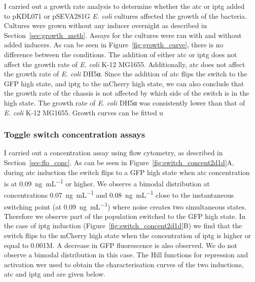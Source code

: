 I carried out a growth rate analysis to determine whether the \acrshort{atc} or \acrshort{iptg} added to pKDL071 or pSEVA281G \textit{E. coli} cultures affected the growth of the bacteria. Cultures were grown without any inducer overnight as described in Section~\ref{sec:growth_meth}. Assays for the cultures were ran with and without added inducers. As can be seen in Figure~\ref{fig:growth_curve}, there is no difference between the conditions. The addition of either \acrshort{atc} or \acrshort{iptg} does not affect the growth rate of \textit{E. coli} K-12 MG1655. Additionally, \acrshort{atc} does not affect the growth rate of \textit{E. coli} DH5α. Since the addition of \acrshort{atc} flips the switch to the GFP high state, and \acrshort{iptg} to the mCherry high state, we can also conclude that the growth rate of the chassis is not affected by which side of the switch is in the high state. The growth rate of \textit{E. coli} DH5α was consistently lower than that of \textit{E. coli} K-12 MG1655. Growth curves can be fitted u




\subsubsection{Toggle switch concentration assays}

I carried out a concentration assay using flow cytometry, as described in Section~\ref{sec:flo_conc}. As can be seen in Figure~\ref{fig:switch_concent2d1d}A, during \acrshort{atc} induction the switch flips to a GFP high state when \acrshort{atc} concentration is at \SI{0.09}{\nano\gram\per\milli\liter} or higher. We observe a bimodal distribution at concentrations \SI{0.07}{\nano\gram\per\milli\liter} and \SI{0.08}{\nano\gram\per\milli\liter} close to the instantaneous switching point (at \SI{0.09}{\nano\gram\per\milli\liter}) where noise creates two simultaneous states. Therefore we observe part of the population switched to the GFP high state. In the case of \acrshort{iptg} induction (Figure~\ref{fig:switch_concent2d1d}B) we find that the switch flips to the mCherry high state when the concentration of \acrshort{iptg} is higher or equal to 0.001M. A decrease in GFP fluorescence is also observed. We do not observe a bimodal distribution in this case. The Hill functions for repression and activation wer used to obtain the characterisation curves of the two inductions, \acrshort{atc} and \acrshort{iptg} and are given below. 

